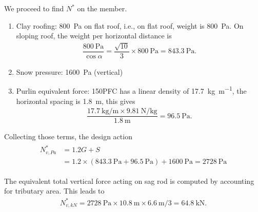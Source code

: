 \begin{solution}
We proceed to find $N^*$ on the member.
\begin{enumerate}
\item Clay roofing: \SI{800}{\pascal} on flat roof, i.e., on flat roof, weight is \SI{800}{\pascal}.
On sloping roof, the weight per horizontal distance is
\begin{gather*}
\dfrac{\SI{800}{\pascal}}{\cos\alpha}=\dfrac{\sqrt{10}}{3}\times\SI{800}{\pascal}=\SI{843.3}{\pascal}.
\end{gather*}
\begin{figure}[H]
\centering\footnotesize
{}
\end{figure}
\item Snow pressure: \SI{1600}{\pascal} (vertical)
\item Purlin equivalent force: 150PFC has a linear density of \SI{17.7}{\kilogram\per\meter}, the horizontal spacing is \SI{1.8}{\meter}, this gives
\begin{gather*}
\dfrac{\SI{17.7}{\kilogram\per\meter}\times\SI{9.81}{\newton\per\kilogram}}{\SI{1.8}{\meter}}=\SI{96.5}{\pascal}.
\end{gather*}
\end{enumerate}
Collecting those terms, the design action
\begin{gather*}
\begin{split}
N^*_{v,Pa}&=1.2G+S\\&=1.2\times\left(\SI{843.3}{\pascal}+\SI{96.5}{\pascal}\right)+\SI{1600}{\pascal}=\SI{2728}{\pascal}
\end{split}
\end{gather*}

The equivalent total vertical force acting on sag rod is computed by accounting for tributary area.
This leads to
\begin{gather*}
N^*_{v,kN}=\SI{2728}{\pascal}\times\SI{10.8}{\meter}\times\SI{6.6}{\meter}/3=\SI{64.8}{\kilo\newton}.
\end{gather*}


\end{solution}
